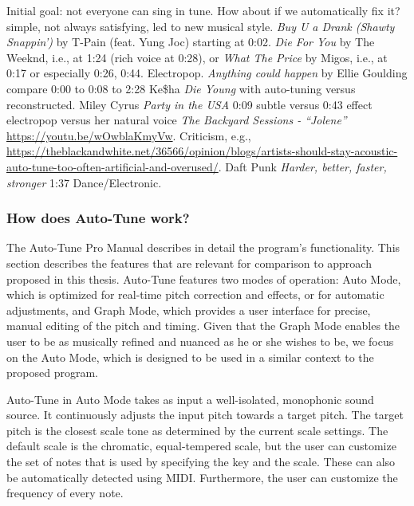 Initial goal: not everyone can sing in tune. How about if we automatically fix it? simple, not always satisfying, led to new musical style. \textit{Buy U a Drank (Shawty Snappin')} by T-Pain (feat. Yung Joc) starting at 0:02. \textit{Die For You} by The Weeknd, i.e., at 1:24 (rich voice at 0:28), or \textit{What The Price} by Migos, i.e., at 0:17 or especially 0:26, 0:44. Electropop. \textit{Anything could happen} by Ellie Goulding compare 0:00 to 0:08 to 2:28 Ke\$ha \textit{Die Young} with auto-tuning versus reconstructed. Miley Cyrus \textit{Party in the USA} 0:09 subtle versus 0:43 effect electropop versus her natural voice \textit{The Backyard Sessions - ``Jolene''} \url{https://youtu.be/wOwblaKmyVw}. Criticism, e.g., \url{https://theblackandwhite.net/36566/opinion/blogs/artists-should-stay-acoustic-auto-tune-too-often-artificial-and-overused/}. Daft Punk \textit{Harder, better, faster, stronger} 1:37 Dance/Electronic.

\subsubsection{How does Auto-Tune work?}
The Auto-Tune Pro Manual \cite{antares:2018} describes in detail the program's functionality. This section describes the features that are relevant for comparison to approach proposed in this thesis. Auto-Tune features two modes of operation: Auto Mode, which is optimized for real-time pitch correction and effects, or for automatic adjustments, and Graph Mode, which provides a user interface for precise, manual editing of the pitch and timing. Given that the Graph Mode enables the user to be as musically refined and nuanced as he or she wishes to be, we focus on the Auto Mode, which is designed to be used in a similar context to the proposed program. 

Auto-Tune in Auto Mode takes as input a well-isolated, monophonic sound source. It continuously adjusts the input pitch towards a target pitch. The target pitch is the closest scale tone as determined by the current scale settings. The default scale is the chromatic, equal-tempered scale, but the user can customize the set of notes that is used by specifying the key and the scale. These can also be automatically detected using MIDI. Furthermore, the user can customize the frequency of every note.


